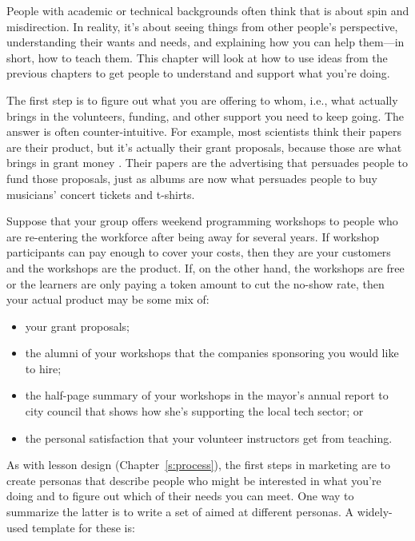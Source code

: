 
People with academic or technical backgrounds often think that
 is about spin and misdirection.
In reality,
it's about seeing things from other people's perspective,
understanding their wants and needs,
and explaining how you can help them---in short,
how to teach them.
This chapter will look at how to use ideas from the previous chapters
to get people to understand and support what you're doing.


The first step is to figure out what you are offering to whom,
i.e.,
what actually brings in the volunteers,
funding,
and other support you need to keep going.
The answer is often counter-intuitive.
For example,
most scientists think their papers are their product,
but it's actually their grant proposals,
because those are what brings in grant money \cite{Kuch2011}.
Their papers are the advertising that persuades people to fund those proposals,
just as albums are now what persuades people to buy musicians' concert tickets and t-shirts.

Suppose that your group offers weekend programming workshops
to people who are re-entering the workforce after being away for several years.
If workshop participants can pay enough to cover your costs,
then they are your customers and the workshops are the product.
If,
on the other hand,
the workshops are free or the learners are only paying a token amount to cut the no-show rate,
then your actual product may be some mix of:

\begin{itemize}

\item
  your grant proposals;

\item
  the alumni of your workshops
  that the companies sponsoring you would like to hire;

\item
  the half-page summary of your workshops in the mayor's annual report to city council
  that shows how she's supporting the local tech sector;
  or

\item
  the personal satisfaction that your volunteer instructors get from teaching.

\end{itemize}

As with lesson design (Chapter~\ref{s:process}),
the first steps in marketing are
to create personas that describe people who might be interested in what you're doing
and to figure out which of their needs you can meet.
One way to summarize the latter is to write a set of 
aimed at different personas.
A widely-used template for these is:

